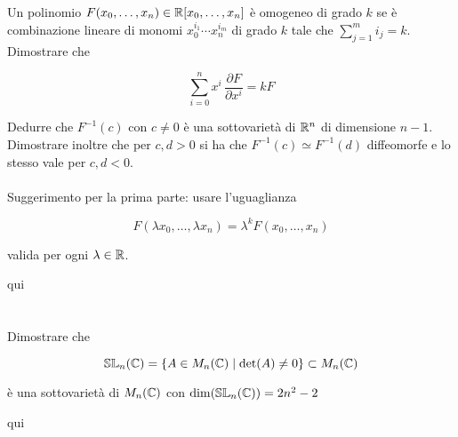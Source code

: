\begin{tcolorbox}
	Un polinomio $ F(x_{0},\dots,x_{n}) \in \mathbb{R}[x_{0},\dots,x_{n}] $ è omogeneo di grado $ k $ se è combinazione lineare di monomi $ x_{0}^{i_{1}} \cdots x_{n}^{i_{m}} $ di grado $ k $ tale che $ \sum_{j=1}^{m} i_{j} = k $. Dimostrare che
	
	\begin{equation}
		\sum_{i=0}^{n} x^{i} \, \dfrac{\partial F}{\partial x^{i}} = k F
	\end{equation}

	Dedurre che $ F^{-1}(c) $ con $ c \neq 0 $ è una sottovarietà di $ \mathbb{R}^{n} $ di dimensione $ n-1 $. Dimostrare inoltre che per $ c,d>0 $ si ha che $ F^{-1}(c) \simeq F^{-1}(d) $ diffeomorfe e lo stesso vale per $ c,d<0 $.\\\\
	Suggerimento per la prima parte: usare l'uguaglianza
	
	\begin{equation}
		F(\lambda x_{0},\dots,\lambda x_{n}) = \lambda^{k} F(x_{0},\dots,x_{n})
	\end{equation}
	
	valida per ogni $ \lambda \in \mathbb{R} $.
\end{tcolorbox}

qui

%

\newpage

%

\section{}\label{es2-16}

\begin{tcolorbox}
	Dimostrare che
	
	\begin{equation}
		\mathbb{SL}_{n}(\mathbb{C}) = \{ A \in M_{n}(\mathbb{C}) \mid \det(A) \neq 0 \} \subset M_{n}(\mathbb{C})
	\end{equation}

	è una sottovarietà di $ M_{n}(\mathbb{C}) $ con $ \dim(\mathbb{SL}_{n}(\mathbb{C})) = 2n^{2}-2  $
\end{tcolorbox}

qui

%

\newpage

%

\section{}\label{es2-17}

